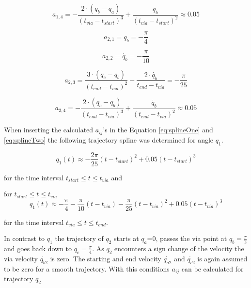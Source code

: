 \begin{equation}
a_{1,4}=-\frac{2\cdot(q_b-q_a)}{(t_{via}-t_{start})^3}+ \frac{\dot{q_b}}{(t_{via}-t_{start})^2} \approx 0.05
\end{equation}

\begin{equation}
a_{2,1}=q_b = -\frac{\pi}{4}
\end{equation}

\begin{equation}
a_{2,2}=\dot{q_b} = -\frac{\pi}{10}
\end{equation}

\begin{equation}
a_{2,3}=\frac{3\cdot(q_c-q_b)}{(t_{end}-t_{via})^2}- \frac{2\cdot \dot{q_b}}{t_{end}-t_{via}} = -\frac{\pi}{25}
\end{equation}

\begin{equation}
a_{2,4}=-\frac{2\cdot(q_c-q_b)}{(t_{end}-t_{via})^3}+ \frac{\dot{q_b}}{(t_{end}-t_{via})^2} \approx 0.05
\end{equation}

When inserting the calculated $a_{ij}$'s in the Equation \ref{eq:splineOne} and \ref{eq:splineTwo} the following trajectory spline was determined
for angle $q_1$. 

\begin{equation}
    q_1(t) \approx -\frac{2\pi}{25}  (t-t_{start})^2  + 0.05(t-t_{start})^3
\end{equation}

for the time interval $ t_{start} \leq t \leq t_{via}$ and 

for $ t_{start} \leq t \leq t_{via}$
\begin{equation}
   q_1(t) \approx -\frac{\pi}{4} - \frac{\pi}{10}  (t- t_{via}) -\frac{\pi}{25}  (t-t_{via})^2 + 0.05 (t-t_{via})^3
   \label{eq:splineTwooo}
\end{equation}

for the time interval $ t_{via} \leq t \leq t_{end}$. 

\newline
In contrast to $q_1$ the trajectory of $q_2$ starts at $q_a$=0, passes the via point at $q_b=\frac{\pi}{2}$ and goes back down to $q_c=\frac{\pi}{4}$. As $q_2$ encounters a sign change of the velocity the via velocity $\dot{q_{b2}}$ is zero. The starting and end velocity $\dot{q_{a2}}$ and $\dot{q_{c2}}$ is again assumed to be zero for a smooth trajectory. 
With this conditions $a_{ij}$ can be calculated for trajectory $q_2$

